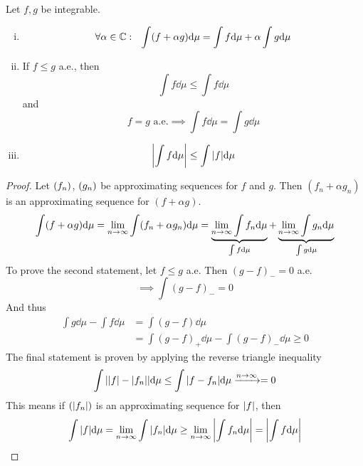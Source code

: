 \documentclass[../../script.tex]{subfiles}
\begin{document}
\begin{thm}
    Let $f, g$ be integrable.
    \begin{enumerate}[(i)]
        \item \[ \forall \alpha \in \mathbb{C}: ~~\int (f + \alpha g) \dd\mu = \int f \dd\mu + \alpha \int g \dd\mu \]
        \item If $f \le g$ a.e., then 
        \[
            \int f \dd\mu \le \int f \dd\mu 
        \]
        and 
        \[
            f = g \text{ a.e.} \implies \int f \dd\mu = \int g \dd\mu
        \]
        \item \[ \abs{\int f \dd\mu} \le \int \abs{f} \dd\mu \]
    \end{enumerate}
\end{thm}
\begin{proof}
    Let $\left(f_n\right)$, $\left(g_n\right)$ be approximating sequences for $f$ and $g$. 
    Then $(f_n + \alpha g_n)$ is an approximating sequence for $(f + \alpha g)$.
    \begin{equation}
        \int (f + \alpha g) \dd\mu = \lim_{n \rightarrow \infty} \int (f_n + \alpha g_n) \dd\mu = \underbrace{\lim_{n \rightarrow \infty} \int f_n \dd\mu}_{\int f \dd\mu} + \underbrace{\lim_{n \rightarrow \infty} \int g_n \dd\mu}_{\int g \dd\mu}
    \end{equation}
    To prove the second statement, let $f \le g$ a.e. Then $(g - f)_- = 0$ a.e.
    \begin{equation}
        \implies \int (g - f)_- = 0 
    \end{equation}
    And thus 
    \begin{equation}
        \begin{split}
            \int g \dd\mu - \int f \dd\mu &= \int (g - f) \dd\mu \\
            &= \int (g - f)_+ \dd\mu - \int (g - f)_- \dd\mu \ge 0
        \end{split}
    \end{equation}
    The final statement is proven by applying the reverse triangle inequality
    \begin{equation}
        \int \abs{\abs{f} - \abs{f_n}} \dd\mu \le \int \abs{f - f_n} \dd\mu \conv{n \rightarrow \infty} = 0
    \end{equation}
    This means if $(\abs{f_n})$ is an approximating sequence for $\abs{f}$, then 
    \begin{equation}
        \int \abs{f} \dd\mu = \lim_{n \rightarrow \infty} \int \abs{f_n} \dd\mu \ge \lim_{n \rightarrow \infty} \abs{\int f_n \dd\mu} = \abs{\int f \dd\mu}
    \end{equation}
\end{proof}
\end{document}
